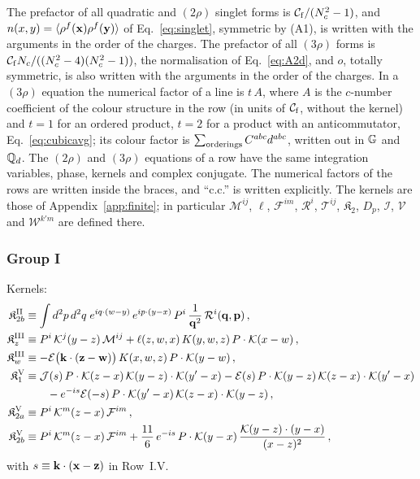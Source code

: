 The prefactor of all quadratic and $(2\rho)$ singlet forms is $\mathcal C_{\rm f}/(N_c^2-1)$, and $n(x,y)=\langle\rho^f(\mathbf{x})\rho^f(\mathbf{y})\rangle$ of Eq.~\eqref{eq:singlet}, symmetric by (A1), is written with the arguments in the order of the charges. The prefactor of all $(3\rho)$ forms is $\mathcal C_{\rm f}N_c/((N_c^2-4)(N_c^2-1))$, the normalisation of Eq.~\eqref{eq:A2d}, and $o$, totally symmetric, is also written with the arguments in the order of the charges. In a $(3\rho)$ equation the numerical factor of a line is $t\,A$, where $A$ is the $c$-number coefficient of the colour structure in the row (in units of $\mathcal C_{\rm f}$, without the kernel) and $t=1$ for an ordered product, $t=2$ for a product with an anticommutator, Eq.~\eqref{eq:cubicavg}; its colour factor is $\sum_{\rm orderings}C^{abc}d^{abc}$, written out in $\mathbb{G}$ and $\mathbb{Q}_d$. The $(2\rho)$ and $(3\rho)$ equations of a row have the same integration variables, phase, kernels and complex conjugate. The numerical factors of the rows are written inside the braces, and ``c.c.'' is written explicitly. The kernels are those of Appendix~\ref{app:finite}; in particular $\mathcal M^{ij}$, $\ell$, $\mathcal F^{im}$, $\mathcal R^i$, $\mathcal T^{ij}$, $\mathfrak K_2$, $D_p$, $\mathcal I$, $\mathcal V$ and $\mathcal W^{k'm}$ are defined there.

\subsubsection*{Group I}
\noindent Kernels:
\begin{align}\label{eq:sGIkernels}
\mathfrak K^{\rm II}_{2b}&\equiv\int d^2p\,d^2q\;e^{iq\cdot(w-y)}\,e^{ip\cdot(y-x)}\,P^i\,\frac{1}{\mathbf{q}^2}\,\mathcal R^i(\mathbf{q},\mathbf{p})\,,\notag\\
\mathfrak K^{\rm III}_z&\equiv P^i\,\mathcal{K}^j(y-z)\,\mathcal M^{ij}+\ell(z,w,x)\,K(y,w,z)\,P\cdot\mathcal{K}(x-w)\,,\notag\\
\mathfrak K^{\rm III}_w&\equiv-\mathcal E\big(\mathbf{k}\cdot(\mathbf{z}-\mathbf{w})\big)\,K(x,w,z)\,P\cdot\mathcal{K}(y-w)\,,\notag\\
\mathfrak K^{\rm V}_1&\equiv\mathcal J(s)\,P\cdot\mathcal{K}(z-x)\,\mathcal{K}(y-z)\cdot\mathcal{K}(y'-x)-\mathcal E(s)\,P\cdot\mathcal{K}(y-z)\,\mathcal{K}(z-x)\cdot\mathcal{K}(y'-x)\notag\\&\qquad-e^{-is}\mathcal E(-s)\,P\cdot\mathcal{K}(y'-x)\,\mathcal{K}(z-x)\cdot\mathcal{K}(y-z)\,,\notag\\
\mathfrak K^{\rm V}_{2a}&\equiv P^i\,\mathcal{K}^m(z-x)\,\mathcal F^{im}\,,\notag\\
\mathfrak K^{\rm V}_{2b}&\equiv P^i\,\mathcal{K}^m(z-x)\,\mathcal F^{im}+\frac{11}{6}\,e^{-is}\,P\cdot\mathcal{K}(y-x)\,\frac{\mathcal{K}(y-z)\cdot(y-x)}{(x-z)^2}\,,
\end{align}
with $s\equiv\mathbf{k}\cdot(\mathbf{x}-\mathbf{z})$ in Row~I.V.

